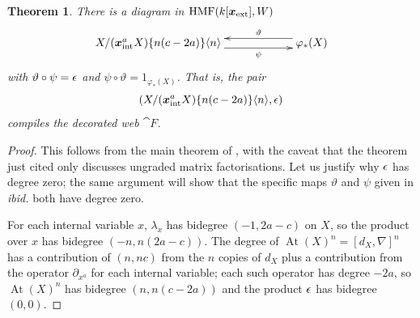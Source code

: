 \documentclass{compositio}
\newtheorem{theorem}{Theorem}[section]
\theoremstyle{definition}
\numberwithin{equation}{section}
\DeclareMathOperator{\HMF}{HMF}
\DeclareMathOperator{\At}{At}
\begin{document}
\begin{theorem}\label{theorem:compilation_main} There is a diagram in $\HMF(k[\extvar], W)$
\begin{equation}
\label{eq:compilation_main1}
\xymatrix@C+3pc{
X/(\intvar^a X)\{ n(c - 2a) \}\langle n \rangle \ar@<-1ex>[r]_-{\psi} & \varphi_*(X) \ar@<-1ex>[l]_-{\vartheta}
}
\end{equation}
with $\vartheta \circ \psi = \epsilon$ and $\psi \circ \vartheta = 1_{\varphi_*(X)}$. That is, the pair
\[
\left(X/(\boldsymbol{x}_{\textup{int}}^a X)\{ n(c - 2a) \}\langle n \rangle, \epsilon\right)
\]
compiles the decorated web $\cat{F}$.
\end{theorem}
\begin{proof}
This follows from the main theorem of \cite{dm1102.2957}, with the caveat that the theorem just cited only discusses ungraded matrix factorisations. Let us justify why $\epsilon$ has degree zero; the same argument will show that the specific maps $\vartheta$ and $\psi$ given in \emph{ibid.} both have degree zero.

For each internal variable $x$, $\lambda_x$ has bidegree $(-1, 2a - c)$ on $X$, so the product over $x$ has bidegree $(-n, n(2a - c))$. The degree of $\At(X)^n = [d_X, \nabla]^n$ has a contribution of $(n, nc)$ from the $n$ copies of $d_X$ plus a contribution from the operator $\partial_{x^a}$ for each internal variable; each such operator has degree $-2a$, so $\At(X)^n$ has bidegree $(n, n(c-2a))$ and the product $\epsilon$ has bidegree $(0,0)$.
\end{proof}
\end{document}
